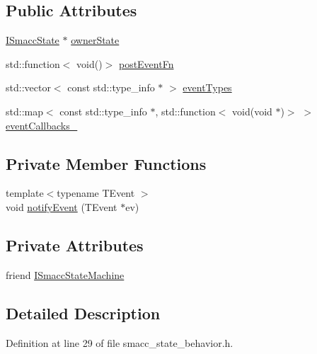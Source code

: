 \subsection*{Public Attributes}
\begin{DoxyCompactItemize}
\item 
\hyperlink{classsmacc_1_1ISmaccState}{I\+Smacc\+State} $\ast$ \hyperlink{classsmacc_1_1StateBehavior_abdc8c883baf520fd01f98e046d045dca}{owner\+State}
\item 
std\+::function$<$ void()$>$ \hyperlink{classsmacc_1_1StateBehavior_aa8485f8a68716ca9429ac8e72e057b7c}{post\+Event\+Fn}
\item 
std\+::vector$<$ const std\+::type\+\_\+info $\ast$ $>$ \hyperlink{classsmacc_1_1StateBehavior_a2df8158ebc3bb0f82c55824f088288bb}{event\+Types}
\item 
std\+::map$<$ const std\+::type\+\_\+info $\ast$, std\+::function$<$ void(void $\ast$)$>$ $>$ \hyperlink{classsmacc_1_1StateBehavior_acbe54c0be9466094565c5b47ab53d84b}{event\+Callbacks\+\_\+}
\end{DoxyCompactItemize}
\subsection*{Private Member Functions}
\begin{DoxyCompactItemize}
\item 
{\footnotesize template$<$typename T\+Event $>$ }\\void \hyperlink{classsmacc_1_1StateBehavior_a9307fb59a1d8bf490d280b8660a13c09}{notify\+Event} (T\+Event $\ast$ev)
\end{DoxyCompactItemize}
\subsection*{Private Attributes}
\begin{DoxyCompactItemize}
\item 
friend \hyperlink{classsmacc_1_1StateBehavior_a4bc03d3369b90283c91d7046461a554a}{I\+Smacc\+State\+Machine}
\end{DoxyCompactItemize}


\subsection{Detailed Description}


Definition at line 29 of file smacc\+\_\+state\+\_\+behavior.\+h.




